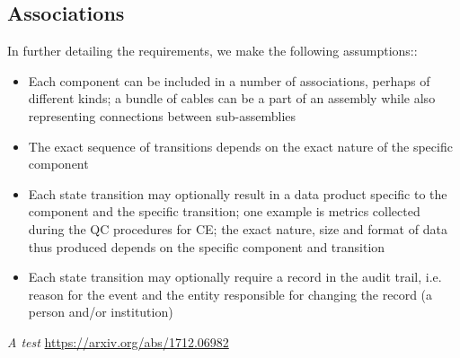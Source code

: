 \documentclass[pdftex,12pt,letter]{article}
\begin{document}
\subsection{Associations}
In further detailing the requirements, we make the following assumptions::

\begin{itemize}

\item Each component can be included in a number of associations, perhaps of different kinds; a bundle of cables
can be a part of an assembly while also representing connections between sub-assemblies

\item The exact sequence of transitions depends on the exact nature of the specific  component

\item Each state transition may optionally result in a data product specific to the component and the specific transition;
one example is metrics collected during the QC procedures for CE; the exact nature, size and format of data thus produced
depends on the specific component and transition

\item Each state transition may optionally require a record in the audit trail, i.e.\,reason for the event and the entity
responsible for changing the record (a person and/or institution)

\end{itemize}


\clearpage

\begin{thebibliography}{1}

{\textit{A test} \url{https://arxiv.org/abs/1712.06982}}

\end{thebibliography}
\end{document}
